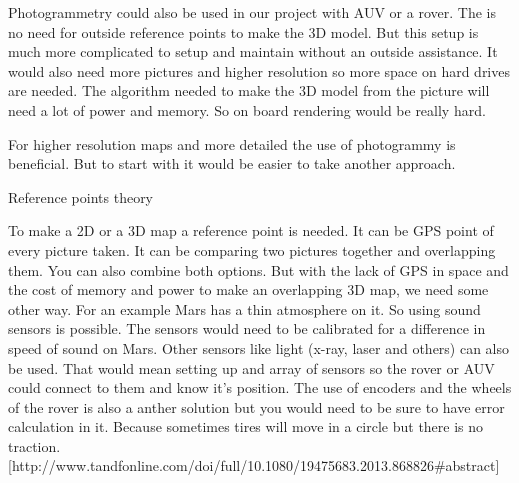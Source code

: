 Photogrammetry could also be used in our project with AUV or a rover. The is no need for outside reference points to make the 3D model. But this setup is much more complicated to setup and maintain without an outside assistance. It would also need more pictures and higher resolution so more space on hard drives are needed. The algorithm needed to make the 3D model from the picture will need a lot of power and memory. So on board rendering would be really hard.

For higher resolution maps and more detailed the use of photogrammy is beneficial. But to start with it would be easier to take another approach.

Reference points theory

To make a 2D or a 3D map a reference point is needed. It can be GPS point of every picture taken. It can be comparing two pictures together and overlapping them. You can also combine both options. But with the lack of GPS in space and the cost of memory and power to make an overlapping 3D map, we need some other way. For an example Mars has a thin atmosphere on it. So using sound sensors is possible. The sensors would need to be calibrated for a difference in speed of sound on Mars. Other sensors like light (x-ray, laser and others) can also be used. That would mean setting up and array of sensors so the rover or AUV could connect to them and know it's position. The use of encoders and the wheels of the rover is also a anther solution but you would need to be sure to have error calculation in it. Because sometimes tires will move in a circle but there is no traction.[http://www.tandfonline.com/doi/full/10.1080/19475683.2013.868826#abstract]  




















